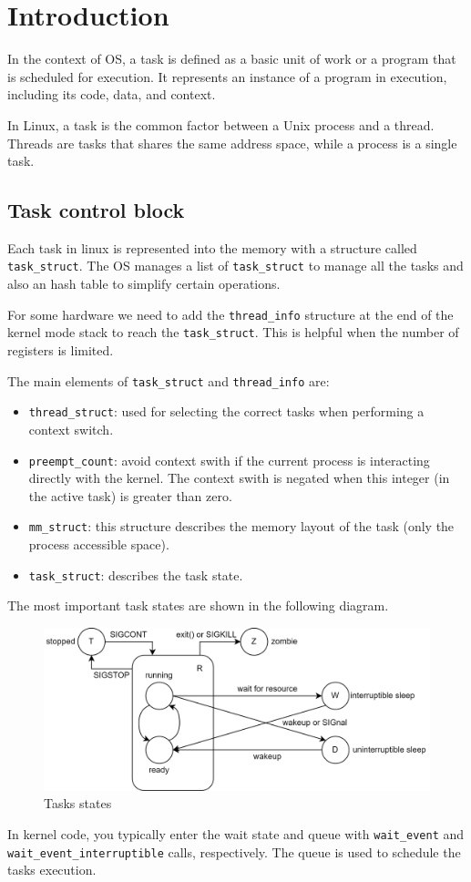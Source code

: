 \section{Introduction}

\begin{definition}
    In the context of OS, a task is defined as a basic unit of work or a program that is scheduled for execution. 
    It represents an instance of a program in execution, including its code, data, and context.
\end{definition}
In Linux, a task is the common factor between a Unix process and a thread. 
Threads are tasks that shares the same address space, while a process is a single task. 

\subsection{Task control block}
Each task in linux is represented into the memory with a structure called \texttt{task\_struct}. 
The OS manages a list of \texttt{task\_struct} to manage all the tasks and also an hash table to simplify certain operations. 

For some hardware we need to add the \texttt{thread\_info} structure at the end of the kernel mode stack to reach the \texttt{task\_struct}.
This is helpful when the number of registers is limited. 

The main elements of \texttt{task\_struct} and \texttt{thread\_info} are: 
\begin{itemize}
    \item \texttt{thread\_struct}: used for selecting the correct tasks when performing a context switch. 
    \item \texttt{preempt\_count}: avoid context swith if the current process is interacting directly with the kernel. 
        The context swith is negated when this integer (in the active task) is greater than zero. 
    \item \texttt{mm\_struct}: this structure describes the memory layout of the task (only the process accessible space). 
    \item \texttt{task\_struct}: describes the task state. 
\end{itemize}
The most important task states are shown in the following diagram. 
\begin{figure}[H]
    \centering
    \includegraphics[width=0.75\linewidth]{images/proc.png}
    \caption{Tasks states}
\end{figure}
In kernel code, you typically enter the wait state and queue with \texttt{wait\_event} and \texttt{wait\_event\_interruptible} calls, respectively.
The queue is used to schedule the tasks execution. 